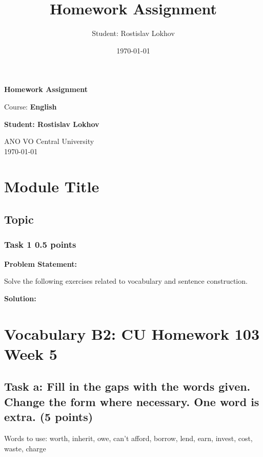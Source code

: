\documentclass[a4paper,12pt]{article}
\title{Homework Assignment}
\author{Student: Rostislav Lokhov}
\date{\today}
\begin{document}
\begin{titlepage}
    \centering
    \vspace{1cm}

    \Huge
    \textbf{Homework Assignment}

    \vspace{0.5cm}
    \LARGE
    Course: \textbf{English}

    \vspace{1.5cm}

    \textbf{Student: Rostislav Lokhov}

    \vfill

    \Large
    ANO VO Central University\\
    \vspace{0.3cm}
    \today

\end{titlepage}

\tableofcontents
\newpage

\section{Module Title}

\subsection{Topic}

\subsubsection{Task 1 \hfill 0.5 points}

\textbf{Problem Statement:}

Solve the following exercises related to vocabulary and sentence construction.

\textbf{Solution:}

\section{Vocabulary B2: CU Homework 103 Week 5}

\subsection{Task a: Fill in the gaps with the words given. Change the form where necessary. One word is extra. (5 points)}

Words to use: worth, inherit, owe, can't afford, borrow, lend, earn, invest, cost, waste, charge
\end{document}
